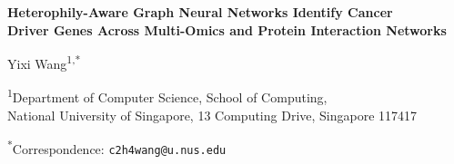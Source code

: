 
{\centering
  \fontsize{17}{21}\bfseries\selectfont
  Heterophily-Aware Graph Neural Networks Identify Cancer\\
  Driver Genes Across Multi-Omics and Protein Interaction Networks
  \par
}

\vspace{1.5em}

{\centering
  \large
  Yixi Wang\textsuperscript{1,*}
  \par
}

\vspace{0.5em}

{\centering
  \normalsize
  \textsuperscript{1}Department of Computer Science, School of Computing,\\
  National University of Singapore, 13 Computing Drive, Singapore 117417
  \par
}

\vspace{0.5em}

{\centering
  \small
  \textsuperscript{*}Correspondence: \texttt{c2h4wang@u.nus.edu}
  \par
}

\vspace{2em}

